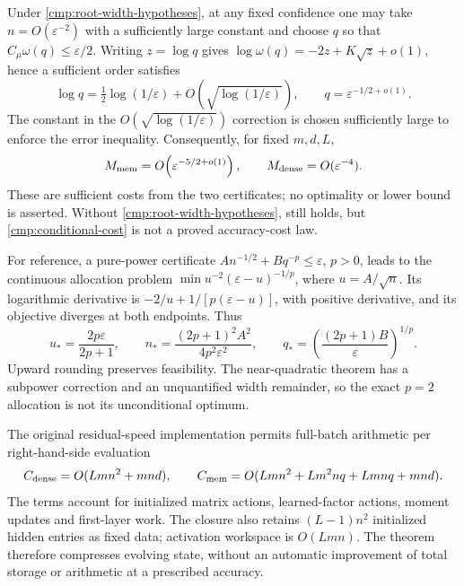Under \eqref{cmp:root-width-hypotheses}, at any fixed confidence one may take
$n=O(\varepsilon^{-2})$ with a sufficiently large constant and choose $q$
so that $C_\mu\omega(q)\le\varepsilon/2$.  Writing $z=\log q$ gives
$\log\omega(q)=-2z+K\sqrt z+o(1)$, hence a sufficient order satisfies
\begin{equation}
 \log q=\tfrac12\log(1/\varepsilon)
                  +O\!\left(\sqrt{\log(1/\varepsilon)}\right),\qquad
 q=\varepsilon^{-1/2+o(1)}.
 \label{cmp:near-quadratic-order}
\end{equation}
The constant in the $O(\sqrt{\log(1/\varepsilon)})$ correction is chosen
sufficiently large to enforce the error inequality.
Consequently, for fixed $m,d,L$,
\begin{equation}
 M_{\rm mem}=O\!\left(\varepsilon^{-5/2+o(1)}\right),\qquad
 M_{\rm dense}=O(\varepsilon^{-4}).
 \label{cmp:conditional-cost}
\end{equation}
These are sufficient costs from the two certificates; no optimality or
lower bound is asserted.  Without \eqref{cmp:root-width-hypotheses},
 still holds, but \eqref{cmp:conditional-cost} is
not a proved accuracy-cost law.

For reference, a pure-power certificate
$A n^{-1/2}+Bq^{-p}\le\varepsilon$, $p>0$, leads to the continuous
allocation problem $\min u^{-2}(\varepsilon-u)^{-1/p}$, where
$u=A/\sqrt n$.  Its logarithmic derivative is
$-2/u+1/[p(\varepsilon-u)]$, with positive derivative, and its objective
diverges at both endpoints.  Thus
\begin{equation}
 u_*=\frac{2p\varepsilon}{2p+1},\qquad
 n_*=\frac{(2p+1)^2A^2}{4p^2\varepsilon^2},\qquad
 q_* =\left(\frac{(2p+1)B}{\varepsilon}\right)^{1/p}.
 \label{cmp:allocation}
\end{equation}
Upward rounding preserves feasibility.  The near-quadratic theorem has a
subpower correction and an unquantified width remainder, so the exact
$p=2$ allocation is not its unconditional optimum.

The original residual-speed implementation permits full-batch arithmetic
per right-hand-side evaluation
\begin{equation}
 C_{\rm dense}=O(Lmn^2+mnd),\qquad
 C_{\rm mem}=O(Lmn^2+Lm^2nq+Lmnq+mnd).
 \label{cmp:response-work}
\end{equation}
The terms account for initialized matrix actions, learned-factor actions,
moment updates and first-layer work.  The closure also retains
$(L-1)n^2$ initialized hidden entries as fixed data; activation workspace
is $O(Lmn)$.
The theorem therefore compresses evolving state, without an automatic
improvement of total storage or arithmetic at a prescribed accuracy.

